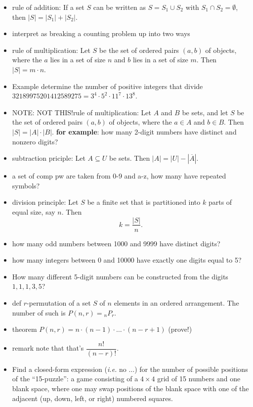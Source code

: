 \begin{itemize}
\item rule of addition: If a set $S$ can be written as $S = S_1 \cup S_2$ with $S_1 \cap S_2 = \emptyset$, then $|S| = |S_1| + |S_2|$.
\item interpret as breaking a counting problem up into two ways
\item rule of multiplication: Let $S$ be the set of ordered pairs $(a, b)$ of objects, where the $a$ lies in a set of size $n$ and $b$ lies in a set of size $m$.  Then $|S| = m \cdot n$.
\item Example determine the number of positive integers that divide $32189975201412589275 = 3^4 \cdot 5^2 \cdot 11^7 \cdot 13^8$.
\item NOTE: NOT THIS!rule of multiplication: Let $A$ and $B$ be sets, and let $S$ be the set of ordered pairs $(a, b)$ of objects, where the $a\in A$ and $b \in B$.  Then $|S| = |A| \cdot |B|$. \textbf{for example}: how many 2-digit numbers have distinct and nonzero digits?
\item subtraction priciple: Let $A \subseteq U$ be sets.  Then $|A| = |U| - |\overline{A}|$.  %
\item a set of comp pw are taken from 0-9 and a-z, how many have repeated symbols?
\item division principle: Let $S$ be a finite set that is partitioned into $k$ parts of equal size, say $n$.  Then $$k = \frac{|S|}{n}.$$
\item how many odd numbers between 1000 and 9999 have distinct digits?
\item how many integers between 0 and 10000 have exactly one digits equal to 5?
\item How many different 5-digit numbers can be constructed from the digits $1, 1, 1, 3, 5$?
\item def $r$-permutation of a set $S$ of $n$ elements in an ordered arrangement.  The number of such is $P(n, r) = {}_n P_r$.
\item theorem $P(n, r) = n \cdot (n-1) \cdot \ldots \cdot (n-r+1)$ (prove!)
\item remark note that that's $\dfrac{n!}{(n-r)!}$.
\item Find a closed-form expression (\textit{i.e.} no $\ldots$) for the number of possible positions of the ``15-puzzle'': a game consisting of a $4\times 4$ grid of 15 numbers and one blank space, where one may swap positions of the blank space with one of the adjacent (up, down, left, or right) numbered squares.

\end{itemize}
